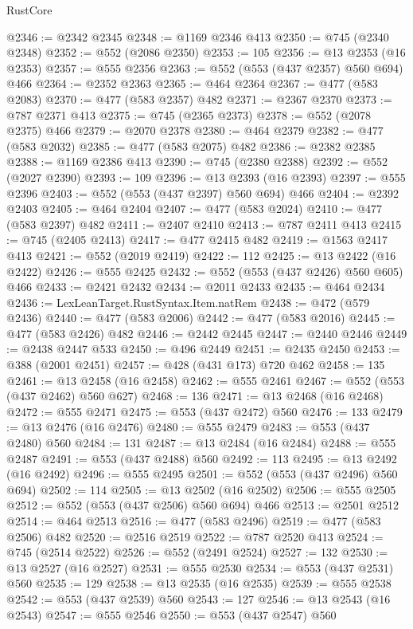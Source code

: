 \begin{lexlean}{RustCore}
\begin{coremodule}
@2346 := @2342 @2345
@2348 := @1169 @2346 @413
@2350 := @745 (@2340 @2348)
@2352 := @552 (@2086 @2350)
@2353 := 105
@2356 := @13 @2353 (@16 @2353)
@2357 := @555 @2356
@2363 := @552 (@553 (@437 @2357) @560 @694) @466
@2364 := @2352 @2363
@2365 := @464 @2364
@2367 := @477 (@583 @2083)
@2370 := @477 (@583 @2357) @482
@2371 := @2367 @2370
@2373 := @787 @2371 @413
@2375 := @745 (@2365 @2373)
@2378 := @552 (@2078 @2375) @466
@2379 := @2070 @2378
@2380 := @464 @2379
@2382 := @477 (@583 @2032)
@2385 := @477 (@583 @2075) @482
@2386 := @2382 @2385
@2388 := @1169 @2386 @413
@2390 := @745 (@2380 @2388)
@2392 := @552 (@2027 @2390)
@2393 := 109
@2396 := @13 @2393 (@16 @2393)
@2397 := @555 @2396
@2403 := @552 (@553 (@437 @2397) @560 @694) @466
@2404 := @2392 @2403
@2405 := @464 @2404
@2407 := @477 (@583 @2024)
@2410 := @477 (@583 @2397) @482
@2411 := @2407 @2410
@2413 := @787 @2411 @413
@2415 := @745 (@2405 @2413)
@2417 := @477 @2415 @482
@2419 := @1563 @2417 @413
@2421 := @552 (@2019 @2419)
@2422 := 112
@2425 := @13 @2422 (@16 @2422)
@2426 := @555 @2425
@2432 := @552 (@553 (@437 @2426) @560 @605) @466
@2433 := @2421 @2432
@2434 := @2011 @2433
@2435 := @464 @2434
@2436 := LexLeanTarget.RustSyntax.Item.natRem
@2438 := @472 (@579 @2436)
@2440 := @477 (@583 @2006)
@2442 := @477 (@583 @2016)
@2445 := @477 (@583 @2426) @482
@2446 := @2442 @2445
@2447 := @2440 @2446
@2449 := @2438 @2447 @533
@2450 := @496 @2449
@2451 := @2435 @2450
@2453 := @388 (@2001 @2451)
@2457 := @428 (@431 @173) @720 @462
@2458 := 135
@2461 := @13 @2458 (@16 @2458)
@2462 := @555 @2461
@2467 := @552 (@553 (@437 @2462) @560 @627)
@2468 := 136
@2471 := @13 @2468 (@16 @2468)
@2472 := @555 @2471
@2475 := @553 (@437 @2472) @560
@2476 := 133
@2479 := @13 @2476 (@16 @2476)
@2480 := @555 @2479
@2483 := @553 (@437 @2480) @560
@2484 := 131
@2487 := @13 @2484 (@16 @2484)
@2488 := @555 @2487
@2491 := @553 (@437 @2488) @560
@2492 := 113
@2495 := @13 @2492 (@16 @2492)
@2496 := @555 @2495
@2501 := @552 (@553 (@437 @2496) @560 @694)
@2502 := 114
@2505 := @13 @2502 (@16 @2502)
@2506 := @555 @2505
@2512 := @552 (@553 (@437 @2506) @560 @694) @466
@2513 := @2501 @2512
@2514 := @464 @2513
@2516 := @477 (@583 @2496)
@2519 := @477 (@583 @2506) @482
@2520 := @2516 @2519
@2522 := @787 @2520 @413
@2524 := @745 (@2514 @2522)
@2526 := @552 (@2491 @2524)
@2527 := 132
@2530 := @13 @2527 (@16 @2527)
@2531 := @555 @2530
@2534 := @553 (@437 @2531) @560
@2535 := 129
@2538 := @13 @2535 (@16 @2535)
@2539 := @555 @2538
@2542 := @553 (@437 @2539) @560
@2543 := 127
@2546 := @13 @2543 (@16 @2543)
@2547 := @555 @2546
@2550 := @553 (@437 @2547) @560

\end{coremodule}
\end{lexlean}

